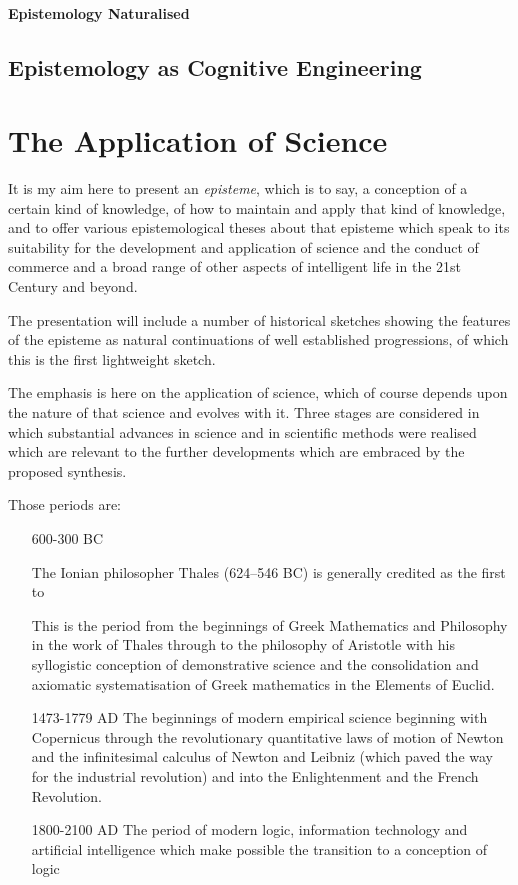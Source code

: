 \documentclass[10pt,titlepage]{book}
\begin{document}
\paragraph{Epistemology Naturalised}

\subsection{Epistemology as Cognitive Engineering}

\section{The Application of Science}

It is my aim here to present an \emph{episteme}, which is to say, a conception of a certain kind of knowledge, of how to maintain and apply that kind of knowledge, and to offer various epistemological theses about that episteme which speak to its suitability for the development and application of science and the conduct of commerce and a broad range of other aspects of intelligent life in the 21st Century and beyond.

The presentation will include a number of historical sketches showing the features of the  episteme as natural continuations of well established progressions, of which this is the first lightweight sketch.

The emphasis is here on the application of science, which of course depends upon the nature of that science and evolves with it.
Three stages are considered in which substantial advances in science and in scientific methods were realised which are relevant to the further developments which are embraced by the proposed synthesis.

Those periods are:


\begin{itemize}

\item[600-300 BC]

  The Ionian philosopher Thales (624–546 BC) is generally credited as the first to 

  This is the period from the beginnings of Greek Mathematics and Philosophy in the work of Thales through to the philosophy of Aristotle with his syllogistic conception of demonstrative science and the consolidation and axiomatic systematisation of Greek mathematics in the Elements of Euclid.

\item[1473-1779 AD] The beginnings of modern empirical science beginning with Copernicus through the revolutionary quantitative laws of motion of Newton and the infinitesimal calculus of Newton and Leibniz (which paved the way for the industrial revolution) and into the Enlightenment and the French Revolution.

\item[1800-2100 AD] The period of modern logic, information technology and artificial intelligence which make possible the transition to a conception of logic

\end{itemize}
\end{document}
